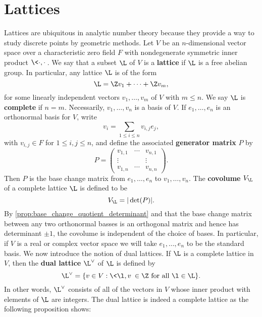   \section{Lattices}
    Lattices are ubiquitous in analytic number theory because they provide a way to study discrete points by geometric methods. Let $V$ be an $n$-dimensional vector space over a characteristic zero field $F$ with nondegenerate symmetric inner product $\<\cdot,\cdot\>$. We say that a subset $\L$ of $V$ is a \textbf{lattice} if $\L$ is a free abelian group. In particular, any lattice $\L$ is of the form
    \[
      \L = \Z v_{1}+\cdots+\Z v_{m},
    \]
    for some linearly independent vectors $v_{1},\ldots,v_{m}$ of $V$ with $m \le n$. We say $\L$ is \textbf{complete} if $n = m$. Necessarily, $v_{1},\ldots,v_{n}$ is a basis of $V$. If $e_{1},\ldots,e_{n}$ is an orthonormal basis for $V$, write
    \[
      v_{i} = \sum_{1 \le i \le n}v_{i,j}e_{j},
    \]
    with $v_{i,j} \in F$ for $1 \le i,j \le n$, and define the associated \textbf{generator matrix} $P$ by
    \[
      P = \begin{pmatrix} v_{1,1} & \cdots & v_{n,1} \\ \vdots & & \vdots \\ v_{1,n} & \cdots & v_{n,n} \end{pmatrix}.
    \]
    Then $P$ is the base change matrix from $e_{1},\ldots,e_{n}$ to $v_{1},\ldots,v_{n}$. The \textbf{covolume} $V_{\L}$ of a complete lattice $\L$ is defined to be
    \[
      V_{\L} = |\det(P)|.
    \]
    By \cref{prop:base_change_quotient_determinant} and that the base change matrix between any two orthonormal basses is an orthogonal matrix and hence has determinant $\pm 1$, the covolume is independent of the choice of bases. In particular, if $V$ is a real or complex vector space we will take $e_{1},\ldots,e_{n}$ to be the standard basis. We now introduce the notion of dual lattices. If $\L$ is a complete lattice in $V$, then the \textbf{dual lattice} $\L^{\vee}$ of $\L$ is defined by
    \[
      \L^{\vee} = \{v \in V:\text{$\<\l,v\> \in \Z$ for all $\l \in \L$}\}.
    \]
    In other words, $\L^{\vee}$ consists of all of the vectors in $V$ whose inner product with elements of $\L$ are integers. The dual lattice is indeed a complete lattice as the following proposition shows:

